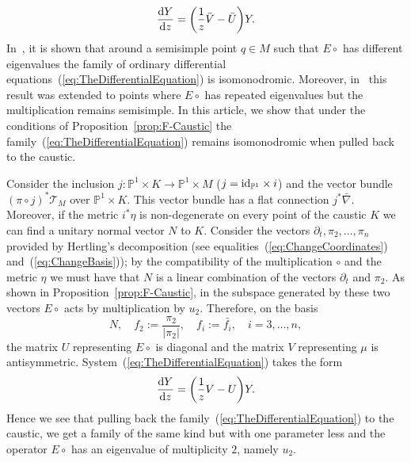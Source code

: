 \documentclass[10pt,a4paper]{amsart}
\numberwithin{equation}{section}
\begin{document}
 \begin{equation*}
 \frac{{\rm d}Y}{{\rm d}z}=\biggl( \frac{1}{z}\bar{V}-\bar{U}\biggr)Y.
 \end{equation*}
 In~\cite{Dubrovin:1994hc}, it is shown that around a semisimple point $q\in M$ such that $E\circ$ has different eigenvalues the family of ordinary differential equations~(\ref{eq:TheDifferentialEquation}) is isomonodromic. Moreover, in~\cite{MR4094756} this result was extended to points where $E\circ$ has repeated eigenvalues but the multiplication remains semisimple. In this article, we show that under the conditions of Proposition~\ref{prop:F-Caustic} the family~(\ref{eq:TheDifferentialEquation}) remains isomonodromic when pulled back to the caustic.

 Consider the inclusion $j\colon\mathbb{P}^{1}\times K\rightarrow\mathbb{P}^{1}\times M$ ($j={\rm id}_{\mathbb{P}^{1}}\times i$) and the vector bundle $(\pi\circ j)^{*}\mathcal{T}_{M}$ over $\mathbb{P}^{1}\times K$. This vector bundle has a flat connection $j^{*}\bar{\nabla}$. Moreover, if the metric $i^{*}\eta$ is non-degenerate on every point of the caustic $K$ we can find a unitary normal vector $N$ to $K$. Consider the vectors $\partial_{t},\pi_{2},\dots,\pi_{n}$ provided by Hertling's decomposition (see equalities~(\ref{eq:ChangeCoordinates}) and~(\ref{eq:ChangeBasis})); by the compatibility of the multiplication $\circ$ and the metric $\eta$ we must have that $N$ is a linear combination of the vectors $\partial_{t}$ and $\pi_{2}$. As shown in Proposition~\ref{prop:F-Caustic}, in the subspace generated by these two vectors $E\circ$ acts by multiplication by $u_{2}$. Therefore, on the basis
 \begin{equation*}
 N, \quad f_{2}:=\frac{\pi_{2}}{|\pi_{2}|},\quad f_{i}:=\bar{f_{i}}, \quad i=3,\dots,n,
 \end{equation*}
 the matrix $U$ representing $E\circ$ is diagonal and the matrix $V$ representing $\mu$ is antisymmetric. System~(\ref{eq:TheDifferentialEquation}) takes the form
 \begin{equation*}
 \frac{{\rm d}Y}{{\rm d}z}=\biggl( \frac{1}{z}V-U\biggr)Y.
 \end{equation*}
 Hence we see that pulling back the family~(\ref{eq:TheDifferentialEquation}) to the caustic, we get a family of the same kind but with one parameter less and the operator $E\circ$ has an eigenvalue of multiplicity $2$, namely $u_{2}$.
\end{document}
